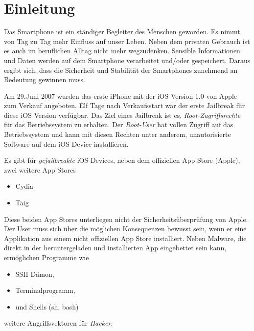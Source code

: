 %
%
%
% 


\chapter{Einleitung}
\label{ch:intro}

Das Smartphone ist ein ständiger Begleiter des Menschen geworden. Es nimmt von Tag zu Tag mehr Einfluss auf unser Leben. Neben dem privaten Gebrauch ist es auch im beruflichen Alltag nicht mehr wegzudenken. Sensible Informationen und Daten werden auf dem Smartphone verarbeitet und/oder gespeichert. Daraus ergibt sich, dass die Sicherheit und Stabilität der Smartphones zunehmend an Bedeutung gewinnen muss.\par 
Am 29.Juni 2007 wurden das erste iPhone mit der iOS Version 1.0 von Apple zum Verkauf angeboten. Elf Tage nach Verkaufsstart war der erste Jailbreak für diese iOS Version verfügbar. Das Ziel eines Jailbreak ist es, \textit{\glqq Root-Zugriffsrechte\grqq{}} für das Betriebssystem zu erhalten. Der \textit{\glqq Root-User\grqq{}} hat vollen Zugriff auf das Betriebssystem und kann mit diesen Rechten unter anderem, unautorisierte Software auf dem iOS Device installieren.\par 

Es gibt für \textit{\glqq gejailbreakte\grqq{}} iOS Devices, neben dem offiziellen App Store (Apple), zwei weitere App Stores
\begin{itemize}
    \item Cydia
    \item Taig
\end{itemize}
Diese beiden App Stores unterliegen nicht der Sicherheitsüberprüfung von Apple. Der User muss sich über die möglichen Konsequenzen bewusst sein, wenn er eine Applikation aus einem nicht offiziellen App Store installiert. Neben Malware, die direkt in der heruntergeladen und installierten App eingebettet sein kann, ermöglichen Programme wie 
\begin{itemize}
    \item SSH Dämon,
    \item Terminalprogramm,
    \item und Shells (sh, bash)
\end{itemize}
weitere Angriffsvektoren für \textit{\glqq Hacker\grqq{}}.

